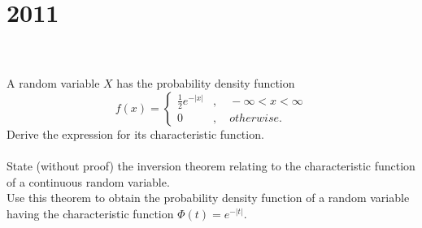 \section*{2011}
\vspace{-.4cm}
\hrulefill \\\\
 A random variable $X$ has the probability density function
\begin{equation*}
    f(x) = \begin{cases}
    \frac{1}{2}e^{-|x|}&,\quad -\infty <x<\infty\\
    0 &,\quad otherwise.
    \end{cases}
\end{equation*}
Derive the expression for its characteristic function.
\\\\
 State (without proof) the inversion theorem relating to the characteristic function of a continuous random variable.\\
Use this theorem to obtain the probability density function of a random variable having the characteristic function $\Phi(t) = e^{-|t|}$.